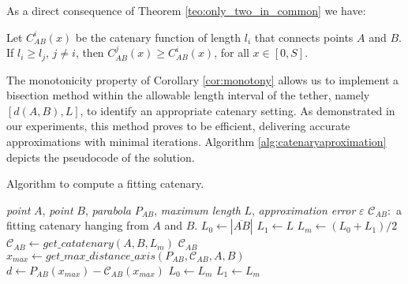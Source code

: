 
As a direct consequence of Theorem 
\ref{teo:only_two_in_common}
we have: 
\begin{corollary}\label{cor:monotony}
Let ${C}_{AB}^{i}(x)$ be the catenary function of length $l_i$ that connects points $A$ and $B$. If $l_i \geq l_j$, $j\neq i$, then ${C}_{AB}^{j}(x) \geq {C}_{AB}^{i}(x)$, for all $x\in [0,S]$.
\end{corollary}


The monotonicity property of Corollary \ref{cor:monotony} allows us to implement a bisection method within the allowable length interval of the tether, namely $[d(A, B), L]$, to identify an appropriate catenary setting.
As demonstrated in our experiments, this method proves to be efficient, delivering accurate approximations with minimal iterations. Algorithm \ref{alg:catenaryaproximation} depicts the pseudocode of the solution.

\begin{algorithm}[t!]
\caption{Algorithm to compute a fitting catenary.}
\label{alg:catenaryaproximation}
\begin{algorithmic}[1]
\Require \emph{point} $A$, \emph{point} $B$, \emph{parabola} ${P_{AB}}$, \emph{maximum length} $L$, \emph{approximation error} $\varepsilon$
\Ensure $\mathcal{C}_{AB}:$ a fitting catenary hanging from $A$ and $B$.
\State $L_0 \gets |\overline{AB}|$
\State $L_1 \gets L$
\State $L_m \gets (L_0+L_1)/2$
\State $\mathcal{C}_{AB} \gets get\_{cat}atenary(A,B,L_m)$
    \Return $\mathcal{C}_{AB}$
\EndIf
\State $x_{max} \gets get\_max\_distance\_axis({P_{AB}},\mathcal{C}_{AB}, A, B)$
\State $d \gets {P_{AB}}(x_{max}) - \mathcal{C}_{AB}(x_{max})$
    \State $L_0 \gets L_m$
\Else{}
    \State $L_1 \gets L_m$
\EndIf

\EndWhile
\end{algorithmic}
\end{algorithm}


